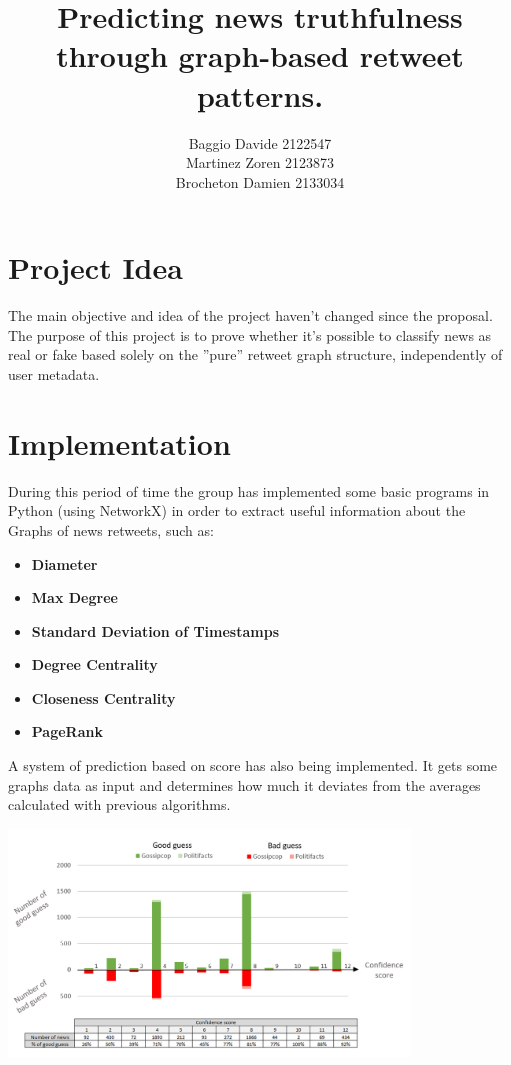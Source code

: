 \documentclass[11pt,a4paper]{article}
\title{Predicting news truthfulness through graph-based retweet patterns.}
\author{Baggio Davide 2122547 \\ Martinez Zoren 2123873 \\ Brocheton Damien 2133034}
\date{}
\begin{document}
\maketitle

\section*{Project Idea}

The main objective and idea of the project haven't changed since the proposal. The purpose of this project is to prove whether it’s possible to classify news as real or fake based solely on the ”pure” retweet
graph structure, independently of user metadata.

\section*{Implementation}

During this period of time the group has implemented some basic programs in Python (using NetworkX\cite{networkx}) in order to extract useful information about the Graphs of news retweets, such as:

\begin{itemize}
	\setlength\itemsep{-0.3em}
	\item \textbf{Diameter}
	\item \textbf{Max Degree}
	\item \textbf{Standard Deviation of Timestamps}
	\item \textbf{Degree Centrality}
	\item \textbf{Closeness Centrality}
	\item \textbf{PageRank}
\end{itemize}

A system of prediction based on score has also being implemented. It gets some graphs data as input and determines how much it deviates from the averages calculated with previous algorithms.

	\begin{center}
	  \includegraphics[width=0.8\textwidth]{graph}
	\end{center}
\end{document}
